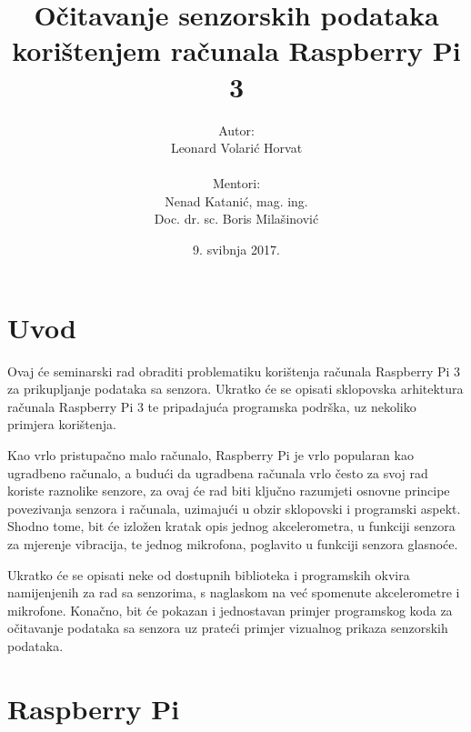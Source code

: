 \documentclass[12pt,a4paper]{article}
\begin{document}
	\title{Očitavanje senzorskih podataka korištenjem računala Raspberry Pi 3}


	\date{9. svibnja 2017.}
	\author{Autor: \\ Leonard Volarić Horvat \\ \\ Mentori: \\ Nenad Katanić, mag. ing.\\
Doc. dr. sc. Boris Milašinović}
	\maketitle

	\tableofcontents
	\newpage

\section{Uvod}
Ovaj će seminarski rad obraditi problematiku korištenja računala Raspberry Pi 3 za prikupljanje podataka sa senzora. Ukratko će se opisati sklopovska arhitektura računala Raspberry Pi 3 te pripadajuća programska podrška, uz nekoliko primjera korištenja. \\ \par
Kao vrlo pristupačno malo računalo, Raspberry Pi je vrlo popularan kao ugradbeno računalo, a budući da ugradbena računala vrlo često za svoj rad koriste raznolike senzore, za ovaj će rad biti ključno razumjeti osnovne principe povezivanja senzora i računala, uzimajući u obzir sklopovski i programski aspekt. Shodno tome, bit će izložen kratak opis jednog akcelerometra, u funkciji senzora za mjerenje vibracija, te jednog mikrofona, poglavito u funkciji senzora glasnoće. \\ \par
Ukratko će se opisati neke od dostupnih biblioteka i programskih okvira namijenjenih za rad sa senzorima, s naglaskom na već spomenute akcelerometre i mikrofone. Konačno, bit će pokazan i jednostavan primjer programskog koda za očitavanje podataka sa senzora uz prateći primjer vizualnog prikaza senzorskih podataka. \\
\newpage


\section{Raspberry Pi}
\end{document}
